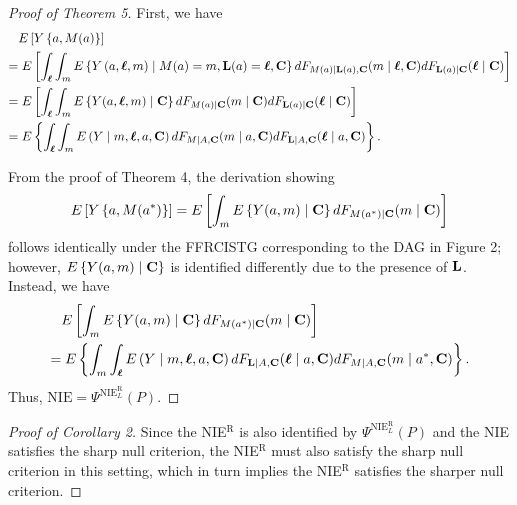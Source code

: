 \documentclass[12pt]{article}
\begin{document}
\begin{proof}[Proof of Theorem 5]
    First, we have
    \begin{align*}
        &E\left[Y\left\{a,M(a)\right\}\right]\\ 
        =&\; E\left[\int_{\boldsymbol{\ell}} \int_m E\left\{Y\left(a,\boldsymbol{\ell},m\right)\mid M(a)=m, {\bf L}(a)=\boldsymbol{\ell}, {\bf C}\right\}dF_{M(a)\mid {\bf L}(a), {\bf C}}(m\mid \boldsymbol{\ell}, {\bf C})dF_{{\bf L}(a)\mid {\bf C}}(\boldsymbol{\ell}\mid {\bf C})\right]\\ 
        =&\;  E\left[\int_{\boldsymbol{\ell}} \int_m E\left\{Y(a, \boldsymbol{\ell}, m)\mid {\bf C}\right\}dF_{M(a)\mid {\bf C}}(m\mid {\bf C})dF_{{\bf L}(a)\mid {\bf C}}(\boldsymbol{\ell}\mid {\bf C})\right]\\
        =&\;  E\left\{\int_{\boldsymbol{\ell}} \int_m E\left(Y\mid m, \boldsymbol{\ell}, a, {\bf C}\right)dF_{M\mid A,{\bf C}}(m\mid a, {\bf C})dF_{{\bf L}\mid A, {\bf C}}(\boldsymbol{\ell}\mid a,{\bf C})\right\}.
    \end{align*}

    From the proof of Theorem 4, the derivation showing
    \[E\left[Y\left\{a,M(a^*)\right\}\right] = E\left[\int_m E\left\{Y(a, m)\mid {\bf C}\right\}dF_{M(a^*)\mid {\bf C}}(m\mid {\bf C})\right]\]
    follows identically under the FFRCISTG corresponding to the DAG in Figure 2; however, $E\left\{Y(a, m)\mid {\bf C}\right\}$ is identified differently due to the presence of $\bf L$. Instead, we have
    \begin{align*}
        &E\left[\int_m E\left\{Y(a, m)\mid {\bf C}\right\}dF_{M(a^*)\mid {\bf C}}(m\mid {\bf C})\right]\\
        =&\; E\left\{\int_m\int_{\boldsymbol{\ell}} E\left(Y\mid m, \boldsymbol{\ell}, a, {\bf C}\right)dF_{{\bf L}\mid A, {\bf C}}(\boldsymbol{\ell}\mid a, {\bf C})dF_{M\mid A, {\bf C}}(m\mid a^*, {\bf C})\right\}.
    \end{align*}
    Thus, $\text{NIE}=\Psi^{\text{NIE}_{L}^{\text{R}}}(P)$.
\end{proof}

\begin{proof}[Proof of Corollary 2]
    Since the NIE$^{\text{R}}$ is also identified by $\Psi^{\text{NIE}_L^{\text{R}}}(P)$ and the NIE satisfies the sharp null criterion, the NIE$^{\text{R}}$ must also satisfy the sharp null criterion in this setting, which in turn implies the NIE$^{\text{R}}$ satisfies the sharper null criterion.
\end{proof}
\end{document}
